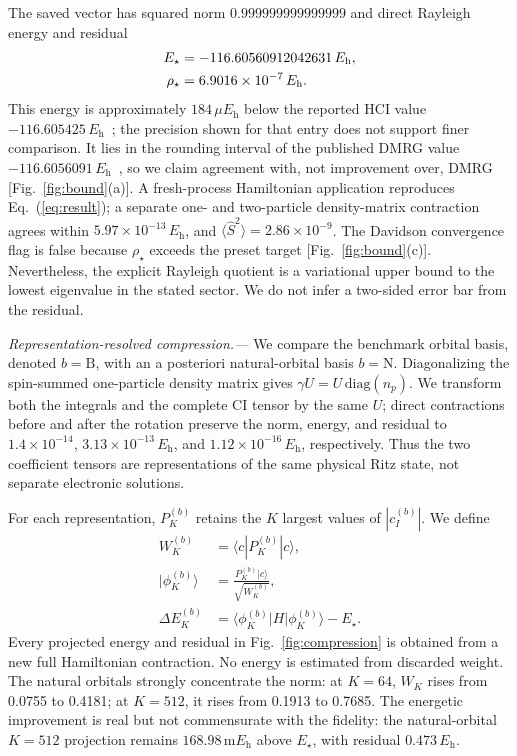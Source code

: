 \documentclass[
  aps,
  reprint,
  superscriptaddress,
  nofootinbib,
  longbibliography,
  floatfix
]{revtex4-2}
\newcommand{\Eh}{E_{\mathrm h}}
\begin{document}
The saved vector has squared norm \(0.999999999999999\) and direct Rayleigh
energy and residual
\begin{equation}
 \begin{aligned}
 E_{\star}&=\FinalEnergy\,\Eh,\\
 \rho_{\star}&=\FinalResidual\,\Eh .
 \end{aligned}
 \label{eq:result}
\end{equation}
This energy is approximately \(184\,\mu\Eh\) below the reported HCI value
\(-116.605425\,\Eh\)~\cite{qatHCI}; the precision shown for that entry does
not support finer comparison.  It lies in the rounding interval of the
published DMRG value \(-116.6056091\,\Eh\)~\cite{li2017,qmbModels}, so we
claim agreement with, not improvement over, DMRG
[Fig.~\ref{fig:bound}(a)].  A fresh-process
Hamiltonian application reproduces Eq.~(\ref{eq:result}); a separate
one- and two-particle density-matrix contraction agrees within
\(5.97\times10^{-13}\,\Eh\), and
\(\langle\hat S^2\rangle=2.86\times10^{-9}\).  The Davidson convergence flag
is false because \(\rho_\star\) exceeds the preset target
[Fig.~\ref{fig:bound}(c)].  Nevertheless, the explicit Rayleigh quotient is a
variational upper bound to the lowest eigenvalue in the stated sector.  We do
not infer a two-sided error bar from the residual.

\textit{Representation-resolved compression.---}
We compare the benchmark orbital basis, denoted \(b=\mathrm{B}\), with an
a posteriori natural-orbital basis \(b=\mathrm{N}\).  Diagonalizing the
spin-summed one-particle density matrix gives
\(\gamma U=U\,\mathrm{diag}(n_p)\).  We transform both the integrals and the
complete CI tensor by the same \(U\); direct contractions before and after the
rotation preserve the norm, energy, and residual to
\(1.4\times10^{-14}\), \(3.13\times10^{-13}\,\Eh\), and
\(1.12\times10^{-16}\,\Eh\), respectively.  Thus the two coefficient tensors
are representations of the same physical Ritz state, not separate electronic
solutions.

For each representation, \(P_K^{(b)}\) retains the \(K\) largest values of
\(|c_I^{(b)}|\).  We define
\begin{equation}
 \begin{aligned}
 W_K^{(b)}&=\langle c|P_K^{(b)}|c\rangle,\\
 |\phi_K^{(b)}\rangle&=\frac{P_K^{(b)}|c\rangle}{\sqrt{W_K^{(b)}}},\\
 \Delta E_K^{(b)}&=\langle\phi_K^{(b)}|H|\phi_K^{(b)}\rangle-E_\star .
 \end{aligned}
 \label{eq:topk}
\end{equation}
Every projected energy and residual in Fig.~\ref{fig:compression} is obtained
from a new full Hamiltonian contraction.  No energy is estimated from discarded
weight.  The natural orbitals strongly concentrate the norm: at \(K=64\),
\(W_K\) rises from 0.0755 to 0.4181; at \(K=512\), it rises from 0.1913 to
0.7685.  The energetic improvement is real but not commensurate with the
fidelity: the natural-orbital \(K=512\) projection remains
\(168.98\,\mathrm{m}\Eh\) above \(E_\star\), with residual
\(0.473\,\Eh\).  \LateBasisSentence
\end{document}
